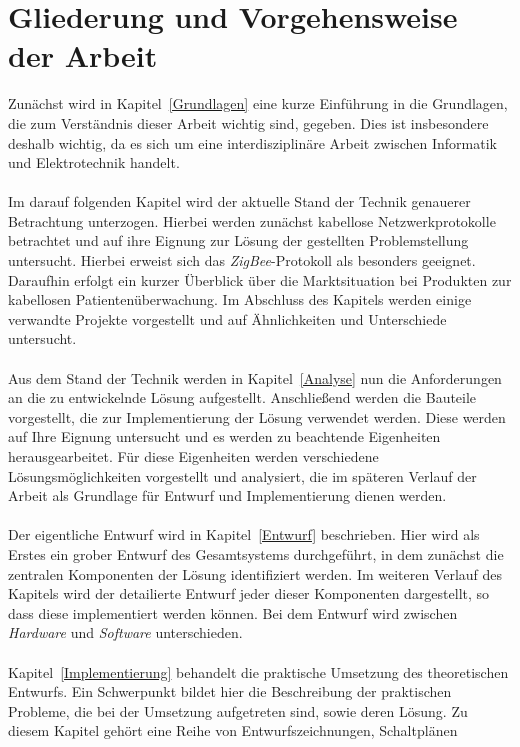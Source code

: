 \section{Gliederung und Vorgehensweise der Arbeit}
Zunächst wird in Kapitel~\ref{Grundlagen} eine kurze Einführung in die Grundlagen,
die zum Verständnis dieser Arbeit wichtig sind, gegeben. Dies ist insbesondere deshalb
wichtig, da es sich um eine interdisziplinäre Arbeit zwischen Informatik und Elektrotechnik handelt.\\
\\
Im darauf folgenden Kapitel wird der aktuelle Stand der Technik genauerer Betrachtung
unterzogen. Hierbei werden zunächst kabellose Netzwerkprotokolle betrachtet und auf
ihre Eignung zur Lösung der gestellten Problemstellung untersucht. Hierbei erweist
sich das \emph{ZigBee}-Protokoll als besonders geeignet. Daraufhin erfolgt
ein kurzer Überblick über die Marktsituation bei Produkten zur kabellosen
Patientenüberwachung. Im Abschluss des Kapitels werden einige verwandte Projekte
vorgestellt und auf Ähnlichkeiten und Unterschiede untersucht.\\
\\
Aus dem Stand der Technik werden in Kapitel~\ref{Analyse} nun die Anforderungen an
die zu entwickelnde Lösung aufgestellt. Anschließend werden die Bauteile vorgestellt,
die zur Implementierung der Lösung verwendet werden. Diese werden auf Ihre Eignung
untersucht und es werden zu beachtende Eigenheiten herausgearbeitet. Für diese
Eigenheiten werden verschiedene Lösungsmöglichkeiten vorgestellt und analysiert,
die im späteren Verlauf der Arbeit als Grundlage für Entwurf und Implementierung
dienen werden.\\
\\
Der eigentliche Entwurf wird in Kapitel~\ref{Entwurf} beschrieben. Hier wird als Erstes 
ein grober Entwurf des Gesamtsystems durchgeführt, in dem zunächst die zentralen
Komponenten der Lösung identifiziert werden. Im weiteren Verlauf des Kapitels
wird der detailierte Entwurf jeder dieser Komponenten dargestellt, so dass diese 
implementiert werden können. Bei dem Entwurf wird zwischen \emph{Hardware}
und \emph{Software} unterschieden.\\
\\
Kapitel~\ref{Implementierung} behandelt die praktische Umsetzung des theoretischen Entwurfs.
Ein Schwerpunkt bildet
hier die Beschreibung der praktischen Probleme, die bei der Umsetzung aufgetreten sind, 
sowie deren Lösung. Zu diesem Kapitel gehört eine Reihe von Entwurfszeichnungen, Schaltplänen

